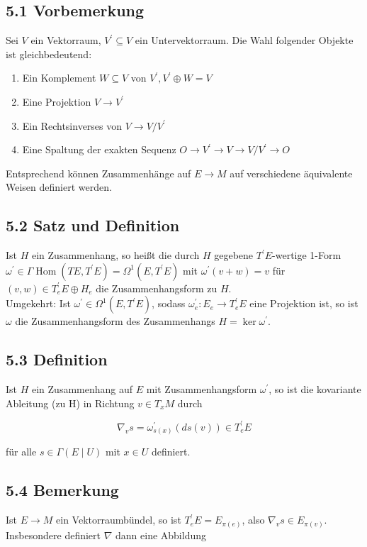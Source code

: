 \documentclass[10pt, letterpaper]{article}
\begin{document}
\subsection*{5.1 Vorbemerkung}
Sei $V$ ein Vektorraum, $V^{\prime} \subseteq V$ ein Untervektorraum. Die Wahl folgender Objekte ist gleichbedeutend:

\begin{enumerate}
  \item Ein Komplement $W \subseteq V$ von $V^{\prime}, V^{\prime} \oplus W=V$
  \item Eine Projektion $V \rightarrow V^{\prime}$
  \item Ein Rechtsinverses von $V \rightarrow V / V^{\prime}$
  \item Eine Spaltung der exakten Sequenz $O \rightarrow V^{\prime} \rightarrow V \rightarrow V / V^{\prime} \rightarrow O$
\end{enumerate}

Entsprechend können Zusammenhänge auf $E \rightarrow M$ auf verschiedene äquivalente Weisen definiert werden.

\subsection*{5.2 Satz und Definition}
Ist $H$ ein Zusammenhang, so heißt die durch $H$ gegebene $T^{\prime} E$-wertige 1-Form $\omega^{\prime} \in \Gamma \operatorname{Hom}\left(T E, T^{\prime} E\right)=\Omega^{1}\left(E, T^{\prime} E\right)$ mit $\omega^{\prime}(v+w)=v$ für $(v, w) \in T_{e}^{\prime} E \oplus H_{e}$ die Zusammenhangsform zu $H$.\\
Umgekehrt: Ist $\omega^{\prime} \in \Omega^{1}\left(E, T^{\prime} E\right)$, sodass $\omega_{e}^{\prime}: E_{e} \rightarrow T_{e}^{\prime} E$ eine Projektion ist, so ist $\omega$ die Zusammenhangsform des Zusammenhangs $H=\operatorname{ker} \omega^{\prime}$.

\subsection*{5.3 Definition}
Ist $H$ ein Zusammenhang auf $E$ mit Zusammenhangsform $\omega^{\prime}$, so ist die kovariante Ableitung (zu H) in Richtung $v \in T_{x} M$ durch

$$
\nabla_{v} s=\omega_{s(x)}^{\prime}(d s(v)) \in T_{e}^{\prime} E
$$

für alle $s \in \Gamma(E \mid U)$ mit $x \in U$ definiert.

\subsection*{5.4 Bemerkung}
Ist $E \rightarrow M$ ein Vektorraumbündel, so ist $T_{e}^{\prime} E=E_{\pi(e)}$, also $\nabla_{v} s \in E_{\pi(v)}$. Insbesondere definiert $\nabla$ dann eine Abbildung
\end{document}
